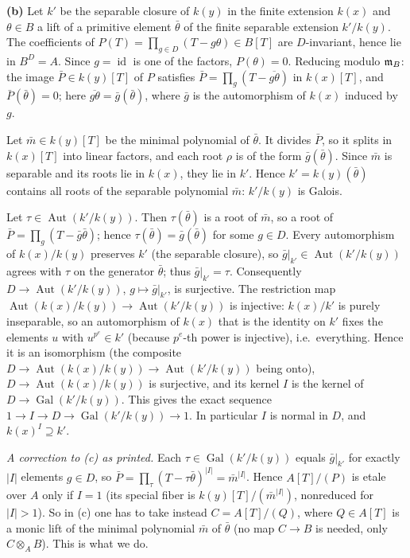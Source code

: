 \documentclass[11pt]{article}
\begin{document}
\textbf{(b)} Let $k'$ be the separable closure of $k(y)$ in the finite extension $k(x)$ and $\theta\in B$ a lift of a primitive element $\bar\theta$ of the finite separable extension $k'/k(y)$. The coefficients of $P(T)=\prod_{g\in D}(T-g\theta)\in B[T]$ are $D$-invariant, hence lie in $B^D=A$. Since $g=\operatorname{id}$ is one of the factors, $P(\theta)=0$. Reducing modulo $\mathfrak m_B$: the image $\bar P\in k(y)[T]$ of $P$ satisfies $\bar P=\prod_{g}(T-\overline{g\theta})$ in $k(x)[T]$, and $\bar P(\bar\theta)=0$; here $\overline{g\theta}=\bar g(\bar\theta)$, where $\bar g$ is the automorphism of $k(x)$ induced by $g$.

Let $\bar m\in k(y)[T]$ be the minimal polynomial of $\bar\theta$. It divides $\bar P$, so it splits in $k(x)[T]$ into linear factors, and each root $\rho$ is of the form $\bar g(\bar\theta)$. Since $\bar m$ is separable and its roots lie in $k(x)$, they lie in $k'$. Hence $k'=k(y)(\bar\theta)$ contains all roots of the separable polynomial $\bar m$: $k'/k(y)$ is Galois.

Let $\tau\in\operatorname{Aut}(k'/k(y))$. Then $\tau(\bar\theta)$ is a root of $\bar m$, so a root of $\bar P=\prod_g(T-\bar g\bar\theta)$; hence $\tau(\bar\theta)=\bar g(\bar\theta)$ for some $g\in D$. Every automorphism of $k(x)/k(y)$ preserves $k'$ (the separable closure), so $\bar g|_{k'}\in\operatorname{Aut}(k'/k(y))$ agrees with $\tau$ on the generator $\bar\theta$; thus $\bar g|_{k'}=\tau$. Consequently $D\to\operatorname{Aut}(k'/k(y))$, $g\mapsto\bar g|_{k'}$, is surjective. The restriction map $\operatorname{Aut}(k(x)/k(y))\to\operatorname{Aut}(k'/k(y))$ is injective: $k(x)/k'$ is purely inseparable, so an automorphism of $k(x)$ that is the identity on $k'$ fixes the elements $u$ with $u^{p^e}\in k'$ (because $p^e$-th power is injective), i.e.\ everything. Hence it is an isomorphism (the composite $D\to\operatorname{Aut}(k(x)/k(y))\to\operatorname{Aut}(k'/k(y))$ being onto), $D\to\operatorname{Aut}(k(x)/k(y))$ is surjective, and its kernel $I$ is the kernel of $D\to\operatorname{Gal}(k'/k(y))$. This gives the exact sequence $1\to I\to D\to\operatorname{Gal}(k'/k(y))\to1$. In particular $I$ is normal in $D$, and $k(x)^I\supseteq k'$.

\emph{A correction to (c) as printed.} Each $\tau\in\operatorname{Gal}(k'/k(y))$ equals $\bar g|_{k'}$ for exactly $|I|$ elements $g\in D$, so $\bar P=\prod_\tau(T-\tau\bar\theta)^{|I|}=\bar m^{|I|}$. Hence $A[T]/(P)$ is etale over $A$ only if $I=1$ (its special fiber is $k(y)[T]/(\bar m^{|I|})$, nonreduced for $|I|>1$). So in (c) one has to take instead $C=A[T]/(Q)$, where $Q\in A[T]$ is a monic lift of the minimal polynomial $\bar m$ of $\bar\theta$ (no map $C\to B$ is needed, only $C\otimes_AB$). This is what we do.
\end{document}
